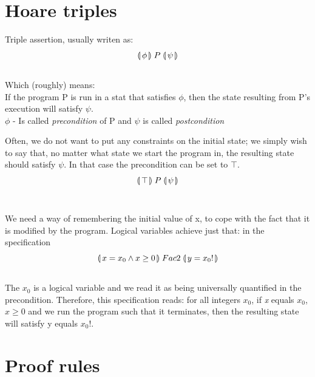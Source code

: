 \documentclass{article}
\newcommand\Hoaretriple[3]{%
  \llparenthesis\,#1\,\rrparenthesis
  \mathrel{#2}\nolinebreak 
  \llparenthesis\,#3\,\rrparenthesis
}
\begin{document}
\section{Hoare triples}
\begin{flushleft}
Triple assertion, usually writen as: \[ \Hoaretriple{\phi}{ P }{\psi} \]\\
Which (roughly) means: \\
If the program P is run in a stat that satisfies $\phi$, then the state resulting from P's execution will satisfy $\psi$.\\
\smallskip
$\phi$ - Is called \textit{precondition} of P and $\psi$ is called \textit{postcondition}
\end{flushleft}

\begin{flushleft}
Often, we do not want to put any constraints on the initial state; we
simply wish to say that, no matter what state we start the program in, the
resulting state should satisfy $\psi$. In that case the precondition can be set to $\top$.
\[ \Hoaretriple{\top}{ P }{\psi} \]\\
\end{flushleft}

\begin{flushleft}
We need a way of remembering the initial value of x, to cope with the fact
that it is modified by the program. Logical variables achieve just that: in the
specification
\[ \Hoaretriple{x=x_{0} \land x \geq 0}{ Fac2 }{y=x_{0}!} \]\\
The $x_{0}$ is a logical variable and
we read it as being universally quantified in the precondition. Therefore, this
specification reads: for all integers $x_{0}$, if \textit{x} equals $x_{0}$, $x \geq 0$ and we run the
program such that it terminates, then the resulting state will satisfy y equals $x_{0}!$.
\end{flushleft}

\section{Proof rules}
\begin{center}
\end{center}
\end{document}
